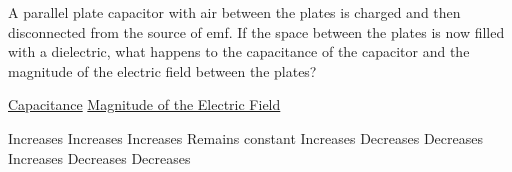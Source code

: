 
\begin{questions}
\setcounter{question}{7}

\question
A parallel plate capacitor with air between the plates is charged and then disconnected from the source of emf. If the space between the plates is now filled with a dielectric, what happens to the capacitance of the capacitor and the magnitude of the electric field between the plates?

\tabto{0.75cm} \underline{Capacitance}
\tabto{3.50cm} \underline{Magnitude of the Electric Field}

\begin{choices}
    \choice Increases \tabto{2.75cm} Increases
    \choice Increases \tabto{2.75cm} Remains constant
    \choice Increases \tabto{2.75cm} Decreases
    \choice Decreases \tabto{2.75cm} Increases
    \choice Decreases \tabto{2.75cm} Decreases
\end{choices}

\end{questions}
